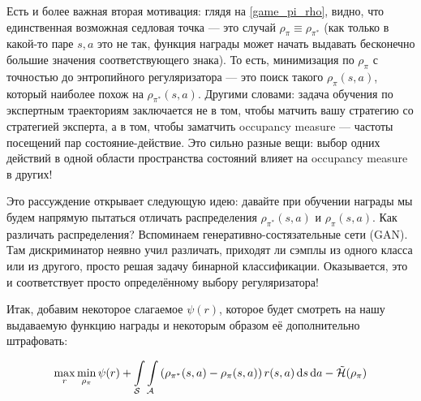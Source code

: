 Есть и более важная вторая мотивация: глядя на \eqref{game_pi_rho}, видно, что единственная возможная седловая точка --- это случай $\rho_{\pi} \equiv \rho_{\pi^*}$ (как только в какой-то паре $s, a$ это не так, функция награды может начать выдавать бесконечно большие значения соответствующего знака). То есть, минимизация по $\rho_\pi$ с точностью до энтропийного регуляризатора --- это поиск такого $\rho_\pi(s, a)$, который наиболее похож на $\rho_{\pi^*}(s, a)$. Другими словами: задача обучения по экспертным траекториям заключается не в том, чтобы матчить вашу стратегию со стратегией эксперта, а в том, чтобы заматчить occupancy measure --- частоты посещений пар состояние-действие. Это сильно разные вещи: выбор одних действий в одной области пространства состояний влияет на occupancy measure в других!

Это рассуждение открывает следующую идею: давайте при обучении награды мы будем напрямую пытаться отличать распределения $\rho_{\pi^*}(s, a)$ и $\rho_{\pi}(s, a)$. Как различать распределения? Вспоминаем генеративно-состязательные сети (GAN). Там дискриминатор неявно учил различать, приходят ли сэмплы из одного класса или из другого, просто решая задачу бинарной классификации. Оказывается, это и соответствует просто определённому выбору регуляризатора!

Итак, добавим некоторое слагаемое $\psi(r)$, которое будет смотреть на нашу выдаваемую функцию награды и некоторым образом её дополнительно штрафовать:

\begin{equation}\label{game_pi_rho_reg}
\max\limits_{r} \min\limits_{\rho_\pi} \psi(r) + \int\limits_{\mathcal{S}} \int\limits_{\mathcal{A}} \left(\rho_{\pi^*}(s, a) - \rho_\pi(s, a)\right) r(s, a) \mathop{}\!\mathrm{d} s \mathop{}\!\mathrm{d} a - \tilde{\mathcal{H}}(\rho_\pi)
\end{equation}

